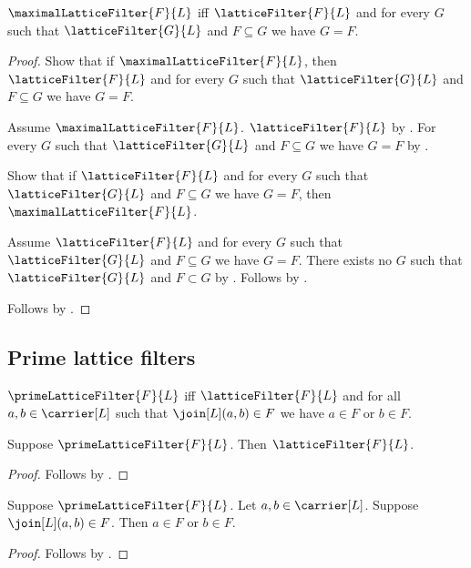 \begin{theorem}\label{maximal_lattice_filter_iff}
    $\maximalLatticeFilter{F}{L}$ iff
        $\latticeFilter{F}{L}$ and
        for every $G$ such that $\latticeFilter{G}{L}$ and
            $F\subseteq G$ we have $G=F$.
\end{theorem}
\begin{proof}
    Show that if $\maximalLatticeFilter{F}{L}$, then
        $\latticeFilter{F}{L}$ and
        for every $G$ such that $\latticeFilter{G}{L}$ and
            $F\subseteq G$ we have $G=F$.
    \begin{subproof}
        Assume $\maximalLatticeFilter{F}{L}$.
        $\latticeFilter{F}{L}$ by
            .
        For every $G$ such that $\latticeFilter{G}{L}$ and
            $F\subseteq G$ we have $G=F$ by
            .
    \end{subproof}
    Show that if $\latticeFilter{F}{L}$ and
        for every $G$ such that $\latticeFilter{G}{L}$ and
            $F\subseteq G$ we have $G=F$, then
        $\maximalLatticeFilter{F}{L}$.
    \begin{subproof}
        Assume $\latticeFilter{F}{L}$ and
            for every $G$ such that $\latticeFilter{G}{L}$ and
                $F\subseteq G$ we have $G=F$.
        There exists no $G$ such that
            $\latticeFilter{G}{L}$ and $F\subset G$ by
            .
        Follows by .
    \end{subproof}
    Follows by \auto.
\end{proof}

\subsection{Prime lattice filters}

\begin{definition}\label{prime_lattice_filter}
    $\primeLatticeFilter{F}{L}$ iff
        $\latticeFilter{F}{L}$ and
        for all $a,b\in\carrier[L]$ such that
            $\join[L](a,b)\in F$ we have $a\in F$ or $b\in F$.
\end{definition}

\begin{proposition}\label{prime_lattice_filter_is_filter}
    Suppose $\primeLatticeFilter{F}{L}$.
    Then $\latticeFilter{F}{L}$.
\end{proposition}
\begin{proof}
    Follows by .
\end{proof}

\begin{proposition}\label{prime_lattice_filter_join_elim}
    Suppose $\primeLatticeFilter{F}{L}$.
    Let $a,b\in\carrier[L]$.
    Suppose $\join[L](a,b)\in F$.
    Then $a\in F$ or $b\in F$.
\end{proposition}
\begin{proof}
    Follows by .
\end{proof}
